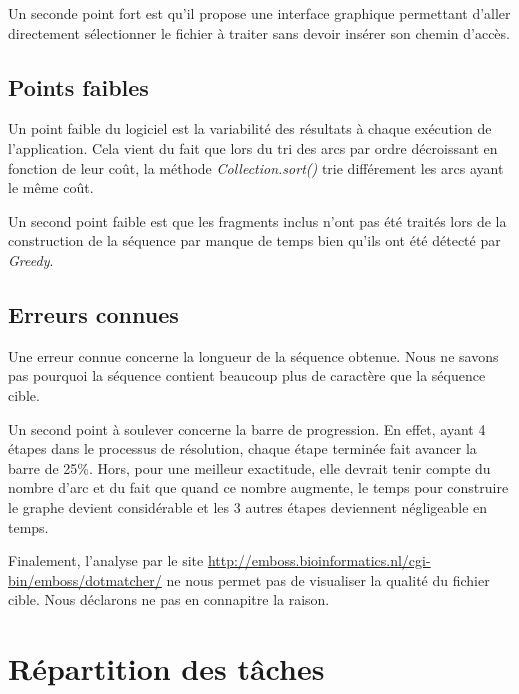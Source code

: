 \documentclass[12pt,a4paper,final]{article}
\begin{document}
Un seconde point fort est qu'il propose une interface graphique permettant d'aller directement sélectionner le fichier à traiter sans devoir insérer son chemin d'accès.

\subsection{Points faibles}

Un point faible du logiciel est la variabilité des résultats à chaque exécution de l'application.  Cela vient du fait que lors du tri des arcs par ordre décroissant en fonction de leur coût, la méthode \textit{Collection.sort()} trie différement les arcs ayant le même coût.\medskip


Un second point faible est que les fragments inclus n'ont pas été traités lors de la construction de la séquence par manque de temps bien qu'ils ont été détecté par \textit{Greedy}.

\subsection{Erreurs connues}

Une erreur connue concerne la longueur de la séquence obtenue.  Nous ne savons pas pourquoi la séquence contient beaucoup plus de caractère que la séquence cible.

Un second point à soulever concerne la barre de progression. En effet, ayant 4 étapes dans le processus de résolution, chaque étape terminée fait avancer la barre de 25\%. Hors, pour une meilleur exactitude, elle devrait tenir compte du nombre d'arc et du fait que quand ce nombre augmente, le temps pour construire le graphe devient considérable et les 3 autres étapes deviennent négligeable en temps.

Finalement, l'analyse par le site \url{http://emboss.bioinformatics.nl/cgi-bin/emboss/dotmatcher/} ne nous permet pas de visualiser la qualité du fichier cible. Nous déclarons ne pas en connapitre la raison.

\newpage
\section{Répartition des tâches}
\end{document}
